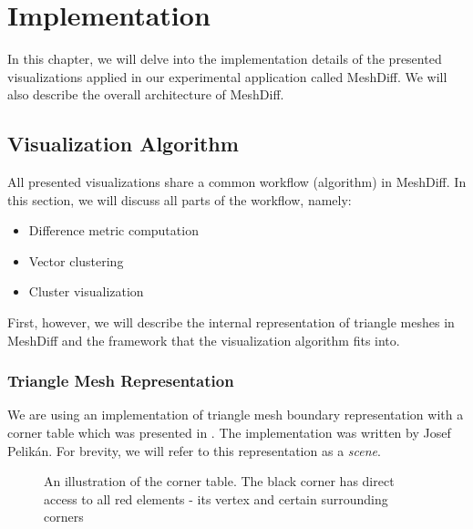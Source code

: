 \chapter{Implementation}
\label{chap:implementation}

In this chapter, we will delve into the implementation details of the presented visualizations applied in our experimental application called MeshDiff. We will also describe the overall architecture of MeshDiff.

\section{Visualization Algorithm}
\label{sec:implementation-algorithm}

All presented visualizations share a common workflow (algorithm) in MeshDiff. In this section, we will discuss all parts of the workflow, namely:

\begin{itemize}
\item Difference metric computation
\item Vector clustering
\item Cluster visualization
\end{itemize}

First, however, we will describe the internal representation of triangle meshes in MeshDiff and the framework that the visualization algorithm fits into.

\subsection{Triangle Mesh Representation}
\label{subsec:implementation-algorithm-mesh_repre}

We are using an implementation of triangle mesh boundary representation with a corner table which was presented in \citet{Corner03}. The implementation was written by Josef Pelikán. For brevity, we will refer to this representation as a {\it scene}.

\begin{figure}[h]
\centering
\def\svgwidth{0.5\textwidth}

\caption[Corner Table Illustration]{An illustration of the corner table. The black corner has direct access to all red elements - its vertex and certain surrounding corners}
\label{fig:illustration-corner_table}
\end{figure}

